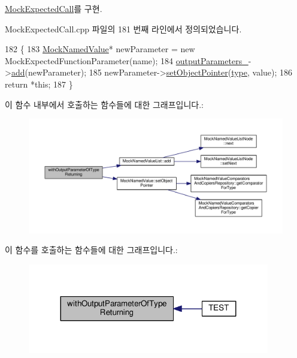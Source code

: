 \hyperlink{class_mock_expected_call_a22dc10d91edbf3fd199be9166b1d3e50}{Mock\+Expected\+Call}를 구현.



Mock\+Expected\+Call.\+cpp 파일의 181 번째 라인에서 정의되었습니다.


\begin{DoxyCode}
182 \{
183     \hyperlink{class_mock_named_value}{MockNamedValue}* newParameter = \textcolor{keyword}{new} MockExpectedFunctionParameter(name);
184     \hyperlink{class_mock_checked_expected_call_ac7fbe8f1a1ddf5d4a0f657d735e928d5}{outputParameters\_}->\hyperlink{class_mock_named_value_list_af014a0a639125fd0c69df2aadcd22bf6}{add}(newParameter);
185     newParameter->\hyperlink{class_mock_named_value_afb0af4eeafa2323ab0de8212c46a50d7}{setObjectPointer}(\hyperlink{namespaceastime__fitline_a7aead736a07eaf25623ad7bfa1f0ee2d}{type}, value);
186     \textcolor{keywordflow}{return} *\textcolor{keyword}{this};
187 \}
\end{DoxyCode}


이 함수 내부에서 호출하는 함수들에 대한 그래프입니다.\+:
\nopagebreak
\begin{figure}[H]
\begin{center}
\leavevmode
\includegraphics[width=350pt]{class_mock_checked_expected_call_a06e26c3b748887a5ad7b696576f0cee3_cgraph}
\end{center}
\end{figure}




이 함수를 호출하는 함수들에 대한 그래프입니다.\+:
\nopagebreak
\begin{figure}[H]
\begin{center}
\leavevmode
\includegraphics[width=299pt]{class_mock_checked_expected_call_a06e26c3b748887a5ad7b696576f0cee3_icgraph}
\end{center}
\end{figure}


